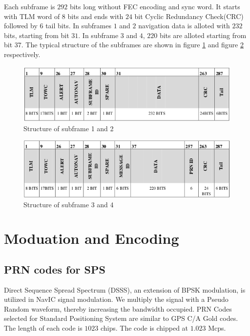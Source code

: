 \noindent Each subframe is $292$ bits long without FEC encoding and sync word. It starts with TLM word of 8 bits and ends with $24$ bit Cyclic Redundancy Check(CRC) followed by $6$ tail bits. In subframes $1$ and $2$ navigation data is alloted with $232$ bits, starting from bit $31$. In subframe $3$ and $4$, $220$ bits are alloted starting from bit $37$. The typical structure of the subframes are shown in figure \ref{fig:frame_1_2} and figure \ref{fig:frame_3_4} respectively.

\begin{figure}[ht]
\centering
\includegraphics[width=0.8\columnwidth]{figs/1_2.png}
\centering
\captionsetup{justification=centering}
\caption{Structure of subframe 1 and 2}
\label{fig:frame_1_2}
\end{figure}

\begin{figure}[ht]
\centering
\includegraphics[width=0.8\columnwidth]{figs/3_4.png}
\centering
\captionsetup{justification=centering}
\caption{Structure of subframe 3 and 4}
\label{fig:frame_3_4}
\end{figure}

\section{Moduation and Encoding}
\subsection{PRN codes for SPS}
Direct Sequence Spread Spectrum (DSSS), an extension of BPSK modulation, is utilized in NavIC signal modulation. We multiply the signal with a Pseudo Random waveform, thereby increasing the bandwidth occupied. PRN Codes selected for Standard Positioning System are similar to GPS C/A Gold codes. The length of each code is $1023$ chips. The code is chipped at $1.023$ Mcps.

